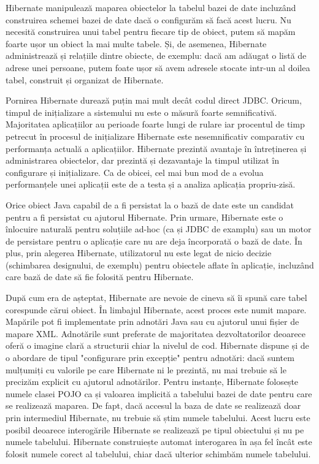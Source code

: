 \documentclass[12pt]{book}
\begin{document}
Hibernate manipulează maparea obiectelor la tabelul bazei de date incluzând construirea schemei bazei de date dacă o configurăm să facă acest lucru. Nu necesită construirea unui tabel pentru fiecare tip de obiect, putem să mapăm foarte ușor un obiect la mai multe tabele. Și, de asemenea, Hibernate administrează și relațiile dintre obiecte, de exemplu: dacă am adăugat o listă de adrese unei persoane, putem foate ușor să avem adresele stocate intr-un al doilea tabel, construit și organizat de Hibernate.

Pornirea Hibernate durează puțin mai mult decât codul direct JDBC. Oricum, timpul de inițializare a sistemului nu este o măsură foarte semnificativă. Majoritatea aplicațiilor au perioade foarte lungi de rulare iar procentul de timp petrecut în procesul de inițializare Hibernate este nesemnificativ comparativ cu performanța actuală a aplicațiilor. Hibernate prezintă avantaje în întreținerea și administrarea obiectelor, dar prezintă și dezavantaje la timpul utilizat în configurare și inițializare. Ca de obicei, cel mai bun mod de a evolua performanțele unei aplicații este de a testa și a analiza aplicația propriu-zisă.

Orice obiect Java capabil de a fi persistat la o bază de date este un candidat pentru a fi persistat cu ajutorul Hibernate. Prin urmare, Hibernate este o înlocuire naturală pentru soluțiile ad-hoc (ca și JDBC de examplu) sau un motor de persistare pentru o aplicație care nu are deja încorporată o bază de date. În plus, prin alegerea Hibernate, utilizatorul nu este legat de nicio decizie (schimbarea designului, de exemplu) pentru obiectele aflate în aplicație, incluzând care bază de date să fie folosită pentru Hibernate.

După cum era de așteptat, Hibernate are nevoie de cineva să îi spună care tabel corespunde cărui obiect. În limbajul Hibernate, acest proces este numit mapare. Mapările pot fi implementate prin adnotări Java sau cu ajutorul unui fișier de mapare XML. Adnotările sunt preferate de majoritatea dezvoltatorilor deoarece oferă o imagine clară a structurii chiar la nivelul de cod. Hibernate dispune și de o abordare de tipul "configurare prin excepție" pentru adnotări: dacă suntem mulțumiți cu valorile pe care Hibernate ni le prezintă, nu mai trebuie să le precizăm explicit cu ajutorul adnotărilor. Pentru instanțe, Hibernate folosește numele clasei POJO ca și valoarea implicită a tabelului bazei de date pentru care se realizează maparea. De fapt, dacă accesul la baza de date se realizează doar prin intermediul Hibernate, nu trebuie să știm numele tabelului. Acest lucru este posibil deoarece interogările Hibernate se realizează pe tipul obiectului și nu pe numele tabelului. Hibernate construiește automat interogarea în așa fel încât este folosit numele corect al tabelului, chiar dacă ulterior schimbăm numele tabelului. \cite{BeginningHibernate}
\end{document}
